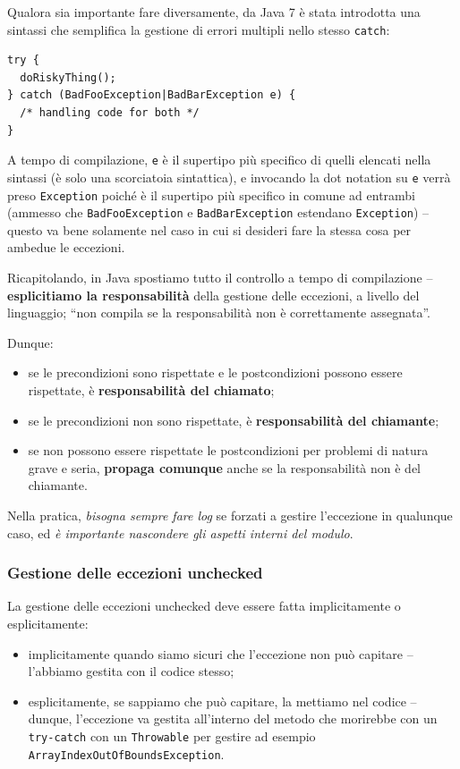 \documentclass[\fontsizeclass,twocolumn]{\classname}
\theoremstyle{definition}
\theoremstyle{definition}
\begin{document}
Qualora sia importante fare diversamente, da Java 7 è stata introdotta una
sintassi che semplifica la gestione di errori multipli nello stesso
\texttt{catch}:

\begin{lstlisting}
try {
  doRiskyThing();
} catch (BadFooException|BadBarException e) {
  /* handling code for both */
}
\end{lstlisting}

A tempo di compilazione, \texttt{e} è il supertipo più specifico di quelli
elencati nella sintassi (è solo una scorciatoia sintattica), e invocando la dot
notation su \texttt{e} verrà preso \texttt{Exception} poiché è il supertipo più
specifico in comune ad entrambi (ammesso che \texttt{BadFooException} e
\texttt{BadBarException} estendano \texttt{Exception}) -- questo va bene
solamente nel caso in cui si desideri fare la stessa cosa per ambedue le
eccezioni.

Ricapitolando, in Java spostiamo tutto il controllo a tempo di compilazione --
\textbf{esplicitiamo la responsabilità} della gestione delle eccezioni, a
livello del linguaggio; ``non compila se la responsabilità non è correttamente
assegnata''.

Dunque:
\begin{itemize}
    \item se le precondizioni sono rispettate e le postcondizioni possono
        essere rispettate, è \textbf{responsabilità del chiamato};
    \item se le precondizioni non sono rispettate, è \textbf{responsabilità del
        chiamante};
    \item se non possono essere rispettate le postcondizioni per problemi di
        natura grave e seria, \textbf{propaga comunque} anche se la
        responsabilità non è del chiamante.
\end{itemize}

Nella pratica, \emph{bisogna sempre fare log} se forzati a gestire l'eccezione
in qualunque caso, ed \emph{è importante nascondere gli aspetti interni del
modulo}.

\subsubsection{Gestione delle eccezioni unchecked}

La gestione delle eccezioni unchecked deve essere fatta implicitamente o
esplicitamente:
\begin{itemize}
    \item implicitamente quando siamo sicuri che l'eccezione non può capitare
        -- l'abbiamo gestita con il codice stesso;
    \item esplicitamente, se sappiamo che può capitare, la mettiamo nel codice
        -- dunque, l'eccezione va gestita all'interno del metodo che morirebbe
        con un \texttt{try\--catch} con un \texttt{Throwable} per gestire ad
        esempio \texttt{ArrayIndex\-Out\-Of\-Bounds\-Exception}.
\end{itemize}
\end{document}
